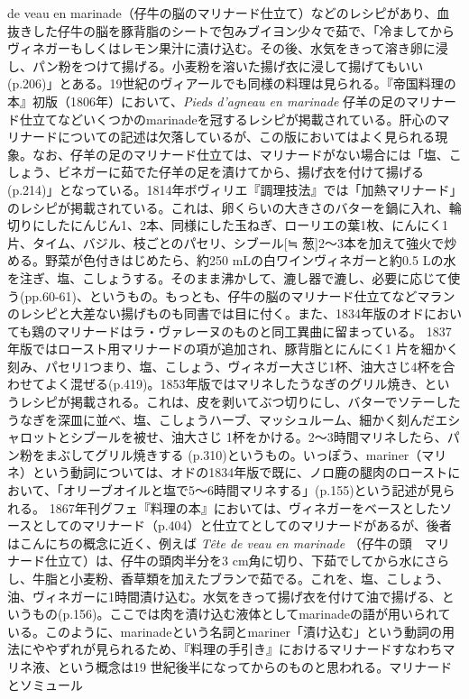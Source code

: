 {{{{{  de veau en
  marinade}（仔牛の脳のマリナード仕立て）などのレシピがあり、血抜きした仔牛の脳を豚背脂のシートで包みブイヨン少々で茹で、「冷ましてからヴィネガーもしくはレモン果汁に漬け込む。その後、水気をきって溶き卵に浸し、パン粉をつけて揚げる。小麦粉を溶いた揚げ衣に浸して揚げてもいい(p.206)」とある。19世紀のヴィアールでも同様の料理は見られる。『帝国料理の本』初版（1806年）において、\emph{Pieds
  d'agneau en marinade}
  仔羊の足のマリナード仕立てなどいくつかのmarinadeを冠するレシピが掲載されている。肝心のマリナードについての記述は欠落しているが、この版においてはよく見られる現象。なお、仔羊の足のマリナード仕立ては、マリナードがない場合には「塩、こしょう、ビネガーに茹でた仔羊の足を漬けてから、揚げ衣を付けて揚げる(p.214)」となっている。1814年ボヴィリエ『調理技法』では「加熱マリナード」のレシピが掲載されている。これは、卵くらいの大きさのバターを鍋に入れ、輪切りにしたにんじん1、2本、同様にした玉ねぎ、ローリエの葉1枚、にんにく1片、タイム、バジル、枝ごとのパセリ、シブール{[}≒
  葱{]}2〜3本を加えて強火で炒める。野菜が色付きはじめたら、約250
  mLの白ワインヴィネガーと約0.5
  Lの水を注ぎ、塩、こしょうする。そのまま沸かして、漉し器で漉し、必要に応じて使う(pp.60-61)、というもの。もっとも、仔牛の脳のマリナード仕立てなどマランのレシピと大差ない揚げものも同書では目に付く。また、1834年版のオドにおいても鶏のマリナードはラ・ヴァレーヌのものと同工異曲に留まっている。
  1837年版ではロースト用マリナードの項が追加され、豚背脂とにんにく1
  片を細かく刻み、パセリ1つまり、塩、こしょう、ヴィネガー大さじ1杯、油大さじ4杯を合わせてよく混ぜる(p.419)。1853年版ではマリネしたうなぎのグリル焼き、というレシピが掲載される。これは、皮を剥いてぶつ切りにし、バターでソテーしたうなぎを深皿に並べ、塩、こしょうハーブ、マッシュルーム、細かく刻んだエシャロットとシブールを被せ、油大さじ
  1杯をかける。2〜3時間マリネしたら、パン粉をまぶしてグリル焼きする
  (p.310)というもの。いっぽう、mariner（マリネ）という動詞については、オドの1834年版で既に、ノロ鹿の腿肉のローストにおいて、「オリーブオイルと塩で5〜6時間マリネする」(p.155)という記述が見られる。
  1867年刊グフェ『料理の本』においては、ヴィネガーをベースとしたソースとしてのマリナード（p.404）と仕立てとしてのマリナードがあるが、後者はこんにちの概念に近く、例えば
  \emph{Tête de veau en marinade}
  （仔牛の頭　マリナード仕立て）は、仔牛の頭肉半分を3
  cm角に切り、下茹でしてから水にさらし、牛脂と小麦粉、香草類を加えたブランで茹でる。これを、塩、こしょう、油、ヴィネガーに1時間漬け込む。水気をきって揚げ衣を付けて油で揚げる、というもの(p.156)。ここでは肉を漬け込む液体としてmarinadeの語が用いられている。このように、marinadeという名詞とmariner「漬け込む」という動詞の用法にややずれが見られるため、『料理の手引き』におけるマリナードすなわちマリネ液、という概念は19
  世紀後半になってからのものと思われる。}}{マリナードとソミュール}}\label{marinades-et-saumures}}

